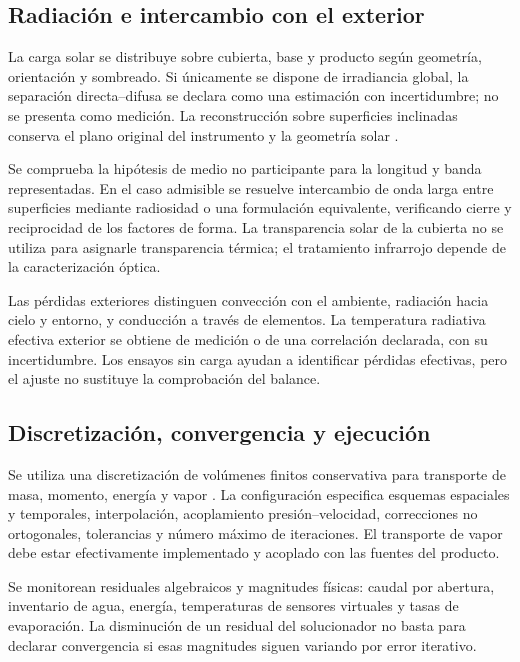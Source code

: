 \subsection{Radiación e intercambio con el exterior}

La carga solar se distribuye sobre cubierta, base y producto según geometría, orientación y sombreado. Si únicamente se dispone de irradiancia global, la separación directa--difusa se declara como una estimación con incertidumbre; no se presenta como medición. La reconstrucción sobre superficies inclinadas conserva el plano original del instrumento y la geometría solar \cite{duffie2013,reda2004}.

Se comprueba la hipótesis de medio no participante para la longitud y banda representadas. En el caso admisible se resuelve intercambio de onda larga entre superficies mediante radiosidad o una formulación equivalente, verificando cierre y reciprocidad de los factores de forma. La transparencia solar de la cubierta no se utiliza para asignarle transparencia térmica; el tratamiento infrarrojo depende de la caracterización óptica.

Las pérdidas exteriores distinguen convección con el ambiente, radiación hacia cielo y entorno, y conducción a través de elementos. La temperatura radiativa efectiva exterior se obtiene de medición o de una correlación declarada, con su incertidumbre. Los ensayos sin carga ayudan a identificar pérdidas efectivas, pero el ajuste no sustituye la comprobación del balance.

\subsection{Discretización, convergencia y ejecución}

Se utiliza una discretización de volúmenes finitos conservativa para transporte de masa, momento, energía y vapor \cite{patankar1980,versteeg2007}. La configuración especifica esquemas espaciales y temporales, interpolación, acoplamiento presión--velocidad, correcciones no ortogonales, tolerancias y número máximo de iteraciones. El transporte de vapor debe estar efectivamente implementado y acoplado con las fuentes del producto.

Se monitorean residuales algebraicos y magnitudes físicas: caudal por abertura, inventario de agua, energía, temperaturas de sensores virtuales y tasas de evaporación. La disminución de un residual del solucionador no basta para declarar convergencia si esas magnitudes siguen variando por error iterativo.


